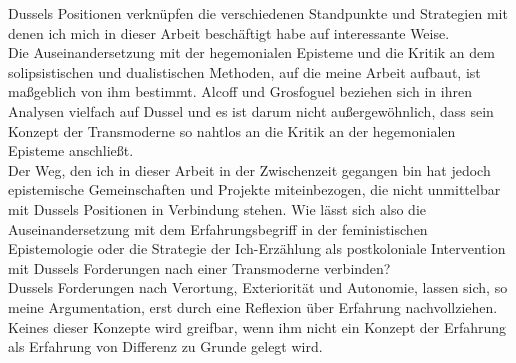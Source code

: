\noindent Dussels Positionen verknüpfen die verschiedenen Standpunkte und Strategien mit
denen ich mich in dieser Arbeit beschäftigt habe auf interessante Weise. \\
Die
Auseinandersetzung mit der hegemonialen Episteme und die Kritik an dem
solipsistischen und dualistischen Methoden, auf die meine Arbeit aufbaut, ist
maßgeblich von ihm bestimmt. Alcoff und Grosfoguel beziehen sich in ihren
Analysen vielfach auf Dussel und es ist darum nicht außergewöhnlich, dass sein
Konzept der Transmoderne so nahtlos an die Kritik an der hegemonialen Episteme
anschließt.\\
 Der Weg, den ich in dieser Arbeit in der Zwischenzeit gegangen bin
hat jedoch epistemische Gemeinschaften und Projekte miteinbezogen, die nicht
unmittelbar mit Dussels Positionen in Verbindung stehen. Wie lässt sich also die
Auseinandersetzung mit dem Erfahrungsbegriff in der feministischen Epistemologie
oder die Strategie der Ich-Erzählung als postkoloniale Intervention mit Dussels
Forderungen nach einer Transmoderne verbinden?\\

\noindent Dussels Forderungen nach Verortung, Exteriorität und Autonomie, lassen sich, so
meine Argumentation, erst durch eine Reflexion über Erfahrung nachvollziehen.
Keines dieser Konzepte wird greifbar, wenn ihm nicht ein Konzept der Erfahrung
als Erfahrung von Differenz zu Grunde gelegt wird.\\

